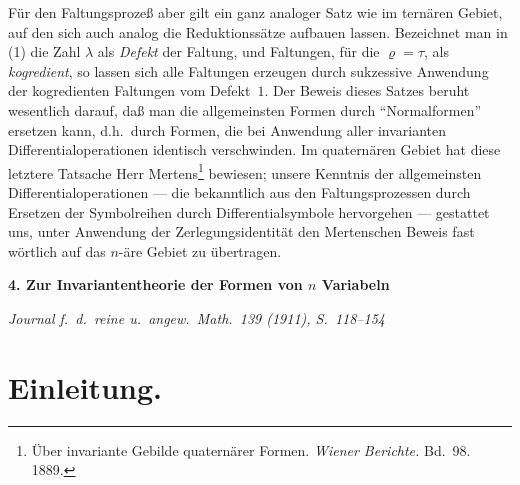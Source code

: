 \documentclass[12pt,a4paper]{article}
\begin{document}
Für den Faltungsprozeß aber gilt ein ganz analoger Satz wie im ternären Gebiet, auf den sich auch analog die Reduktionssätze aufbauen lassen. Bezeichnet man in (1) die Zahl $\lambda$ als \textit{Defekt} der Faltung, und Faltungen, für die $\varrho = \tau$, als \textit{kogredient}, so lassen sich alle Faltungen erzeugen durch sukzessive Anwendung der kogredienten Faltungen vom Defekt~$1$. Der Beweis dieses Satzes beruht wesentlich darauf, daß man die allgemeinsten Formen durch ``Normalformen'' ersetzen kann, d.h.\ durch Formen, die bei Anwendung aller invarianten Differentialoperationen identisch verschwinden. Im quaternären Gebiet hat diese letztere Tatsache Herr Mertens\footnote{Über invariante Gebilde quaternärer Formen. \textit{Wiener Berichte.} Bd.~98. 1889.} bewiesen; unsere Kenntnis der allgemeinsten Differentialoperationen --- die bekanntlich aus den Faltungsprozessen durch Ersetzen der Symbolreihen durch Differentialsymbole hervorgehen --- gestattet uns, unter Anwendung der Zerlegungsidentität den Mertenschen Beweis fast wörtlich auf das $n$-äre Gebiet zu übertragen.

\newpage

\begin{center}
\textbf{4. Zur Invariantentheorie der Formen von $n$ Variabeln}

\smallskip
\textit{Journal f.~d.~reine u.~angew.\ Math.\ 139 (1911), S.~118--154}
\end{center}

\section*{Einleitung.}
\end{document}
